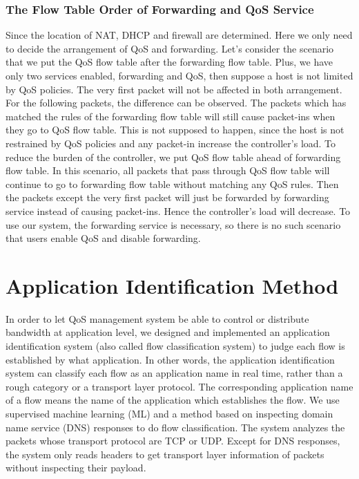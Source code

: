 \documentclass[journal]{IEEEtran}
\begin{document}
\subsubsection{The Flow Table Order of Forwarding and QoS Service}
Since the location of NAT, DHCP and firewall are determined. Here we only need to decide the arrangement of QoS and forwarding.
Let's consider the scenario that we put the QoS flow table after the forwarding flow table. Plus, we have only two services enabled, forwarding and QoS, then suppose a host is not limited by QoS policies. The very first packet will not be affected in both arrangement. For the following packets, the difference can be observed. The packets which has matched the rules of the forwarding flow table will still cause packet-ins when they go to QoS flow table. This is not supposed to happen, since the host is not restrained by QoS policies and any packet-in increase the controller's load.
To reduce the burden of the controller, we put QoS flow table ahead of forwarding flow table. In this scenario, all packets that pass through QoS flow table will continue to go to forwarding flow table without matching any QoS rules. Then the packets except the very first packet will just be forwarded by forwarding service instead of causing packet-ins. Hence the controller's load will decrease. To use our system, the forwarding service is necessary, so there is no such scenario that users enable QoS and disable forwarding.






\section{Application Identification Method}\label{sec:app_identification}
In order to let QoS management system be able to control or distribute bandwidth at application level,
we designed and implemented an application identification system (also called flow classification system)
to judge each flow is established by what application.
In other words, the application identification system can classify each flow as an application name in real time,
rather than a rough category or a transport layer protocol.
The corresponding application name of a flow means the name of the application which establishes the flow.
We use supervised machine learning (ML) and a method based on inspecting domain name service (DNS) responses to do flow classification.
The system analyzes the packets whose transport protocol are TCP or UDP.
Except for DNS responses, the system only reads headers to get transport layer information of
packets without inspecting their payload.
\end{document}
